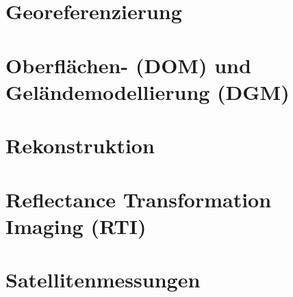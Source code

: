 \section{Georeferenzierung}
	

\section{Oberflächen- (DOM) und Geländemodellierung (DGM)}
	

	
\section{Rekonstruktion}
	
	
\newpage
\section{Reflectance Transformation Imaging (RTI)}
	

\newpage
\section{Satellitenmessungen}%
	



